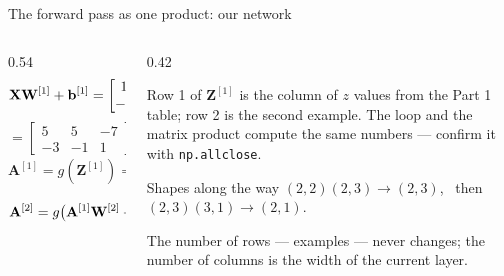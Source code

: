 \documentclass[aspectratio=169,10pt]{beamer}
\begin{document}
\begin{frame}{The forward pass as one product: our network}
  \footnotesize
  \begin{columns}[T,onlytextwidth]
    \begin{column}{0.54\textwidth}
      \[ \mathbf{X}\mathbf{W}^{[1]} + \mathbf{b}^{[1]} =
         \begin{bmatrix}1&2\\-1&-1\end{bmatrix}
         \begin{bmatrix}1&-3&5\\2&4&-6\end{bmatrix}
         + [-1,\,1,\,2] \]
      \[ = \begin{bmatrix}5&5&-7\\-3&-1&1\end{bmatrix} + [-1,\,1,\,2]
         = \begin{bmatrix}4&6&-5\\-4&0&3\end{bmatrix} = \mathbf{Z}^{[1]} \]
      \[ \mathbf{A}^{[1]} = g(\mathbf{Z}^{[1]}) =
         \begin{bmatrix}0.9820&0.9975&0.0067\\0.0180&0.5000&0.9526\end{bmatrix} \]
      \[ \mathbf{A}^{[2]} = g\bigl(\mathbf{A}^{[1]}\mathbf{W}^{[2]}+b^{[2]}\bigr)
         = g\!\left(\begin{bmatrix}1.4464\\-2.8217\end{bmatrix}\right)
         = \begin{bmatrix}0.8094\\0.0562\end{bmatrix} \]
    \end{column}
    \begin{column}{0.42\textwidth}
      \begin{keyidea}
        Row 1 of $\mathbf{Z}^{[1]}$ is the column of $z$ values from the Part 1 table;
        row 2 is the second example. The loop and the matrix product compute the same
        numbers --- confirm it with \texttt{np.allclose}.
      \end{keyidea}
      \begin{block}{Shapes along the way}
        $(2,2)(2,3)\to(2,3)$, \ then \ $(2,3)(3,1)\to(2,1)$.\par
        The number of rows --- examples --- never changes; the number of columns is the
        width of the current layer.
      \end{block}
    \end{column}
  \end{columns}
\end{frame}
\end{document}
